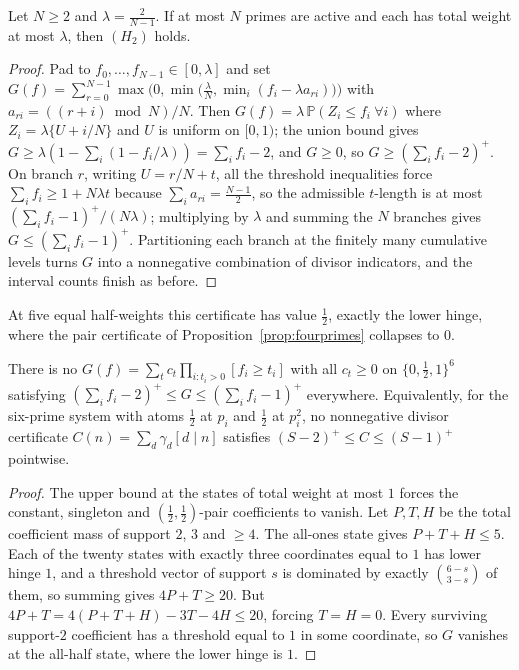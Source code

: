 \begin{theorem}\label{thm:cap}
Let $N\ge2$ and $\lambda=\tfrac2{N-1}$. If at most $N$ primes are active and each has total weight at
most $\lambda$, then $(H_2)$ holds.
\end{theorem}
\begin{proof}
Pad to $f_0,\dots,f_{N-1}\in[0,\lambda]$ and set
$G(f)=\sum_{r=0}^{N-1}\max\bigl(0,\min\bigl(\tfrac\lambda N,\min_i(f_i-\lambda a_{ri})\bigr)\bigr)$ with
$a_{ri}=((r+i)\bmod N)/N$. Then $G(f)=\lambda\,\mathbb P(Z_i\le f_i\ \forall i)$ where
$Z_i=\lambda\{U+i/N\}$ and $U$ is uniform on $[0,1)$; the union bound gives
$G\ge\lambda(1-\sum_i(1-f_i/\lambda))=\sum_if_i-2$, and $G\ge0$, so $G\ge(\sum_if_i-2)^+$. On branch
$r$, writing $U=r/N+t$, all the threshold inequalities force $\sum_if_i\ge1+N\lambda t$ because
$\sum_ia_{ri}=\tfrac{N-1}2$, so the admissible $t$-length is at most $(\sum_if_i-1)^+/(N\lambda)$;
multiplying by $\lambda$ and summing the $N$ branches gives $G\le(\sum_if_i-1)^+$. Partitioning each
branch at the finitely many cumulative levels turns $G$ into a nonnegative combination of divisor
indicators, and the interval counts finish as before.
\end{proof}

At five equal half-weights this certificate has value $\tfrac12$, exactly the lower hinge, where the
pair certificate of Proposition~\ref{prop:fourprimes} collapses to $0$.

\begin{proposition}\label{prop:sixobstruction}
There is no $G(f)=\sum_tc_t\prod_{i:t_i>0}[f_i\ge t_i]$ with all $c_t\ge0$ on $\{0,\tfrac12,1\}^6$
satisfying $(\sum_if_i-2)^+\le G\le(\sum_if_i-1)^+$ everywhere. Equivalently, for the six-prime
system with atoms $\tfrac12$ at $p_i$ and $\tfrac12$ at $p_i^2$, no nonnegative divisor certificate
$C(n)=\sum_d\gamma_d[d\mid n]$ satisfies $(S-2)^+\le C\le(S-1)^+$ pointwise.
\end{proposition}
\begin{proof}
The upper bound at the states of total weight at most $1$ forces the constant, singleton and
$(\tfrac12,\tfrac12)$-pair coefficients to vanish. Let $P,T,H$ be the total coefficient mass of
support $2$, $3$ and $\ge4$. The all-ones state gives $P+T+H\le5$. Each of the twenty states with
exactly three coordinates equal to $1$ has lower hinge $1$, and a threshold vector of support $s$ is
dominated by exactly $\binom{6-s}{3-s}$ of them, so summing gives $4P+T\ge20$. But
$4P+T=4(P+T+H)-3T-4H\le20$, forcing $T=H=0$. Every surviving support-$2$ coefficient has a threshold
equal to $1$ in some coordinate, so $G$ vanishes at the all-half state, where the lower hinge is $1$.
\end{proof}

